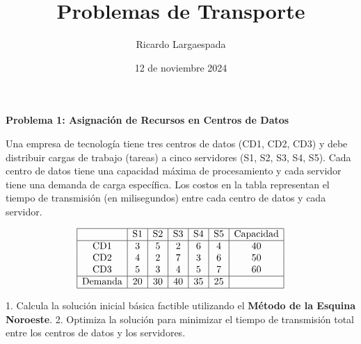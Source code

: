 \documentclass{article}
\title{Problemas de Transporte}
\author{Ricardo Largaespada}
\date{12 de noviembre 2024}
\begin{document}
\maketitle

\vspace{-1cm}
\begin{problem}
\textbf{Problema 1: Asignación de Recursos en Centros de Datos}

Una empresa de tecnología tiene tres centros de datos (CD1, CD2, CD3) y debe distribuir cargas de trabajo (tareas) a cinco servidores (S1, S2, S3, S4, S5). Cada centro de datos tiene una capacidad máxima de procesamiento y cada servidor tiene una demanda de carga específica. Los costos en la tabla representan el tiempo de transmisión (en milisegundos) entre cada centro de datos y cada servidor.

\[
\begin{array}{|c|c|c|c|c|c|c|}
\hline
           & \text{S1} & \text{S2} & \text{S3} & \text{S4} & \text{S5} & \text{Capacidad} \\
\hline
\text{CD1} & 3         & 5         & 2         & 6         & 4         & 40        \\
\text{CD2} & 4         & 2         & 7         & 3         & 6         & 50        \\
\text{CD3} & 5         & 3         & 4         & 5         & 7         & 60        \\
\hline
\text{Demanda} & 20    & 30        & 40        & 35        & 25        &           \\
\hline
\end{array}
\]

1. Calcula la solución inicial básica factible utilizando el \textbf{Método de la Esquina Noroeste}.
2. Optimiza la solución para minimizar el tiempo de transmisión total entre los centros de datos y los servidores.

\end{problem}

\vspace{-0.5cm}
\end{document}

